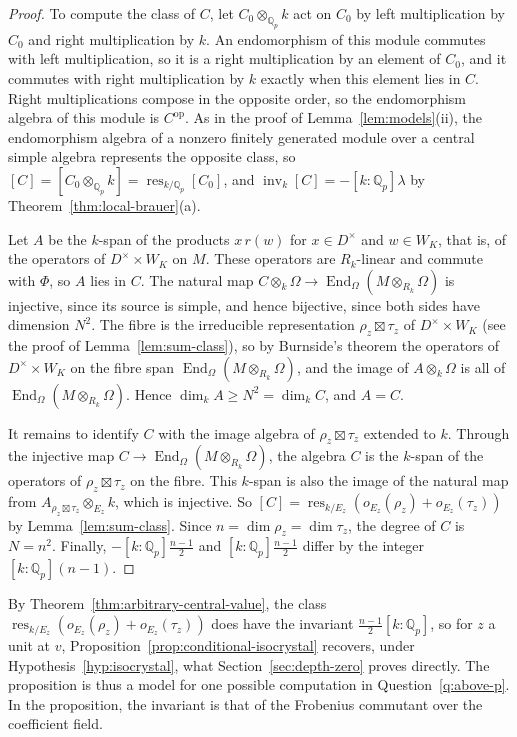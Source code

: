 \documentclass[a4paper,11pt]{amsart}
\theoremstyle{definition}
\theoremstyle{remark}
\numberwithin{equation}{section}
\newcommand{\Q}{\mathbb{Q}}
\DeclareMathOperator{\inv}{inv}
\DeclareMathOperator{\res}{res}
\DeclareMathOperator{\End}{End}
\newcommand{\op}{\mathrm{op}}
\begin{document}
\begin{proof}
To compute the class of $C$, let $C_0\otimes_{\Q_p}k$ act on $C_0$ by left multiplication by $C_0$ and right multiplication by $k$. An endomorphism of this module commutes with left multiplication, so it is a right multiplication by an element of $C_0$, and it commutes with right multiplication by $k$ exactly when this element lies in $C$. Right multiplications compose in the opposite order, so the endomorphism algebra of this module is $C^{\op}$. As in the proof of Lemma~\ref{lem:models}(ii), the endomorphism algebra of a nonzero finitely generated module over a central simple algebra represents the opposite class, so $[C]=[C_0\otimes_{\Q_p}k]=\res_{k/\Q_p}[C_0]$, and $\inv_k[C]=-[k:\Q_p]\lambda$ by Theorem~\ref{thm:local-brauer}(a).

Let $A$ be the $k$-span of the products $x\,r(w)$ for $x\in D^\times$ and $w\in W_K$, that is, of the operators of $D^\times\times W_K$ on $M$. These operators are $R_k$-linear and commute with $\Phi$, so $A$ lies in $C$. The natural map $C\otimes_k\Omega\to\End_\Omega(M\otimes_{R_k}\Omega)$ is injective, since its source is simple, and hence bijective, since both sides have dimension $N^2$. The fibre is the irreducible representation $\rho_z\boxtimes\tau_z$ of $D^\times\times W_K$ (see the proof of Lemma~\ref{lem:sum-class}), so by Burnside's theorem the operators of $D^\times\times W_K$ on the fibre span $\End_\Omega(M\otimes_{R_k}\Omega)$, and the image of $A\otimes_k\Omega$ is all of $\End_\Omega(M\otimes_{R_k}\Omega)$. Hence $\dim_kA\geq N^2=\dim_kC$, and $A=C$.

It remains to identify $C$ with the image algebra of $\rho_z\boxtimes\tau_z$ extended to $k$. Through the injective map $C\to\End_\Omega(M\otimes_{R_k}\Omega)$, the algebra $C$ is the $k$-span of the operators of $\rho_z\boxtimes\tau_z$ on the fibre. This $k$-span is also the image of the natural map from $A_{\rho_z\boxtimes\tau_z}\otimes_{E_z}k$, which is injective. So $[C]=\res_{k/E_z}(o_{E_z}(\rho_z)+o_{E_z}(\tau_z))$ by Lemma~\ref{lem:sum-class}. Since $n=\dim\rho_z=\dim\tau_z$, the degree of $C$ is $N=n^2$. Finally, $-[k:\Q_p]\frac{n-1}2$ and $[k:\Q_p]\frac{n-1}2$ differ by the integer $[k:\Q_p](n-1)$.
\end{proof}

By Theorem~\ref{thm:arbitrary-central-value}, the class $\res_{k/E_z}(o_{E_z}(\rho_z)+o_{E_z}(\tau_z))$ does have the invariant $\frac{n-1}2[k:\Q_p]$, so for $z$ a unit at $v$, Proposition~\ref{prop:conditional-isocrystal} recovers, under Hypothesis~\ref{hyp:isocrystal}, what Section~\ref{sec:depth-zero} proves directly. The proposition is thus a model for one possible computation in Question~\ref{q:above-p}. In the proposition, the invariant is that of the Frobenius commutant over the coefficient field.
\end{document}
